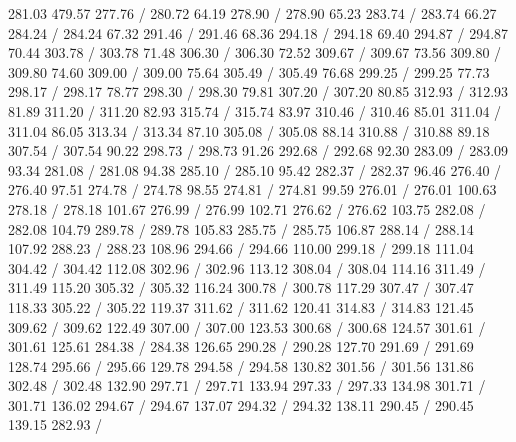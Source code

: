 { 281.03 479.57 277.76 /
\setsolid
{} 280.72 64.19 278.90 /
 278.90 65.23 283.74 /
 283.74 66.27 284.24 /
 284.24 67.32 291.46 /
 291.46 68.36 294.18 /
 294.18 69.40 294.87 /
 294.87 70.44 303.78 /
 303.78 71.48 306.30 /
 306.30 72.52 309.67 /
 309.67 73.56 309.80 /
 309.80 74.60 309.00 /
 309.00 75.64 305.49 /
 305.49 76.68 299.25 /
 299.25 77.73 298.17 /
 298.17 78.77 298.30 /
 298.30 79.81 307.20 /
 307.20 80.85 312.93 /
 312.93 81.89 311.20 /
 311.20 82.93 315.74 /
 315.74 83.97 310.46 /
 310.46 85.01 311.04 /
 311.04 86.05 313.34 /
 313.34 87.10 305.08 /
 305.08 88.14 310.88 /
 310.88 89.18 307.54 /
 307.54 90.22 298.73 /
 298.73 91.26 292.68 /
 292.68 92.30 283.09 /
 283.09 93.34 281.08 /
 281.08 94.38 285.10 /
 285.10 95.42 282.37 /
 282.37 96.46 276.40 /
 276.40 97.51 274.78 /
 274.78 98.55 274.81 /
 274.81 99.59 276.01 /
 276.01 100.63 278.18 /
 278.18 101.67 276.99 /
 276.99 102.71 276.62 /
 276.62 103.75 282.08 /
 282.08 104.79 289.78 /
 289.78 105.83 285.75 /
 285.75 106.87 288.14 /
 288.14 107.92 288.23 /
 288.23 108.96 294.66 /
 294.66 110.00 299.18 /
 299.18 111.04 304.42 /
 304.42 112.08 302.96 /
 302.96 113.12 308.04 /
 308.04 114.16 311.49 /
 311.49 115.20 305.32 /
 305.32 116.24 300.78 /
 300.78 117.29 307.47 /
 307.47 118.33 305.22 /
 305.22 119.37 311.62 /
 311.62 120.41 314.83 /
 314.83 121.45 309.62 /
 309.62 122.49 307.00 /
 307.00 123.53 300.68 /
 300.68 124.57 301.61 /
 301.61 125.61 284.38 /
 284.38 126.65 290.28 /
 290.28 127.70 291.69 /
 291.69 128.74 295.66 /
 295.66 129.78 294.58 /
 294.58 130.82 301.56 /
 301.56 131.86 302.48 /
 302.48 132.90 297.71 /
 297.71 133.94 297.33 /
 297.33 134.98 301.71 /
 301.71 136.02 294.67 /
 294.67 137.07 294.32 /
 294.32 138.11 290.45 /
 290.45 139.15 282.93 /
}
